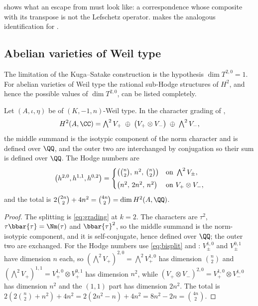  shows what an escape from 
must look like: a correspondence whose composite with its transpose is not the
Lefschetz operator.  makes the analogous identification for
.

\subsection{Abelian varieties of Weil type}

The limitation of the Kuga--Satake construction is the hypothesis
$\dim T^{2,0}=1$. For abelian varieties of Weil type the rational sub-Hodge
structures of $H^{2}$, and hence the possible values of $\dim T^{2,0}$, can be
listed completely.

\begin{proposition}\label{prop:h2pieces}
Let $(A,\iota,\eta)$ be of $(K,-1,n)$-Weil type. In the character grading of
,
\begin{equation}\label{eq:h2split}
  H^{2}(A,\CC)
  =\textstyle\bigwedge^{2}V_{+}\;\oplus\;\bigl(V_{+}\otimes V_{-}\bigr)
   \;\oplus\;\bigwedge^{2}V_{-},
\end{equation}
the middle summand is the isotypic component of the norm character and is
defined over $\QQ$, and the outer two are interchanged by conjugation so their
sum is defined over $\QQ$. The Hodge numbers are
\[
  \bigl(h^{2,0},h^{1,1},h^{0,2}\bigr)=
  \begin{cases}
    \bigl(\tbinom{n}{2},\,n^{2},\,\tbinom{n}{2}\bigr)
      & \text{on }\bigwedge^{2}V_{\pm},\\[4pt]
    \bigl(n^{2},\,2n^{2},\,n^{2}\bigr)
      & \text{on }V_{+}\otimes V_{-},
  \end{cases}
\]
and the total is $2\tbinom{2n}{2}+4n^{2}=\tbinom{4n}{2}=\dim H^{2}(A,\QQ)$.
\end{proposition}

\begin{proof}
The splitting is \eqref{eq:grading} at $k=2$. The characters are
$\tau^{2}$, $\tau\bbar{\tau}=\Nm(\tau)$ and $\bbar{\tau}^{2}$, so the middle
summand is the norm-isotypic component, and it is self-conjugate, hence defined
over $\QQ$; the outer two are exchanged. For the Hodge numbers use
\eqref{eq:bisplit} and : $V_{\pm}^{1,0}$ and
$V_{\pm}^{0,1}$ have dimension $n$ each, so
$(\bigwedge^{2}V_{+})^{2,0}=\bigwedge^{2}V^{1,0}_{+}$ has dimension
$\binom{n}{2}$ and $(\bigwedge^{2}V_{+})^{1,1}=V^{1,0}_{+}\otimes V^{0,1}_{+}$
has dimension $n^{2}$, while
$(V_{+}\otimes V_{-})^{2,0}=V^{1,0}_{+}\otimes V^{1,0}_{-}$ has dimension
$n^{2}$ and the $(1,1)$ part has dimension $2n^{2}$. The total is
$2(2\binom{n}{2}+n^{2})+4n^{2}=2(2n^{2}-n)+4n^{2}=8n^{2}-2n=\binom{4n}{2}$.
\end{proof}

